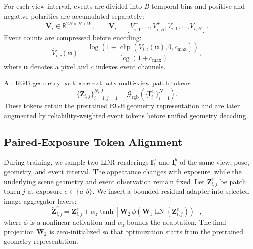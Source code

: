 For each view interval, events are divided into $B$ temporal bins and positive
and negative polarities are accumulated separately:
\begin{equation}
    \bm{V}_{i}\in\mathbb{R}^{2B\times H\times W},\qquad
    \bm{V}_{i}=
    [V_{i,1}^{+},\ldots,V_{i,B}^{+},V_{i,1}^{-},\ldots,V_{i,B}^{-}].
    \label{eq:event_voxel}
\end{equation}
Event counts are compressed before encoding:
\begin{equation}
    \widehat{V}_{i,c}(\bm{u})=
    \frac{\log\!\left(1+\operatorname{clip}
    (V_{i,c}(\bm{u}),0,c_{\max})\right)}
    {\log(1+c_{\max})},
    \label{eq:event_normalization}
\end{equation}
where $\bm{u}$ denotes a pixel and $c$ indexes event channels.

An RGB geometry backbone extracts multi-view patch tokens:
\begin{equation}
    \{\bm{Z}_{i,j}\}_{i=1,j=1}^{N,J}
    =\mathcal{G}_{\mathrm{rgb}}
    (\{\bm{I}_{i}^{e_i}\}_{i=1}^{N}).
    \label{eq:coarse_geometry}
\end{equation}
These tokens retain the pretrained RGB geometry representation and are later
augmented by reliability-weighted event tokens before unified geometry
decoding.

\subsection{Paired-Exposure Token Alignment}
\label{sec:paired_token_alignment}

During training, we sample two LDR renderings $\bm{I}_{i}^{a}$ and
$\bm{I}_{i}^{b}$ of the same view, pose, geometry, and event interval. The
appearance changes with exposure, while the underlying scene geometry and
event observation remain fixed. Let $\bm{Z}_{i,j}^{e}$ be patch token $j$ at
exposure $e\in\{a,b\}$. We insert a bounded residual adapter into selected
image-aggregator layers:
\begin{equation}
    \widetilde{\bm{Z}}_{i,j}^{e}
    =\bm{Z}_{i,j}^{e}
    +\alpha_{z}\tanh\!\left[
    \bm{W}_{2}\,\phi\!\left(
    \bm{W}_{1}\operatorname{LN}(\bm{Z}_{i,j}^{e})
    \right)\right],
    \label{eq:token_adapter}
\end{equation}
where $\phi$ is a nonlinear activation and $\alpha_z$ bounds the adaptation.
The final projection $\bm{W}_{2}$ is zero-initialized so that optimization
starts from the pretrained geometry representation.

